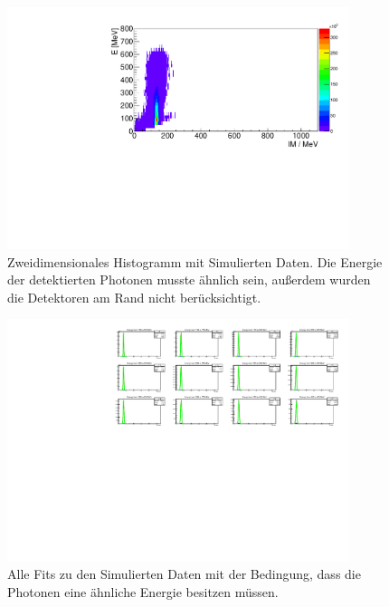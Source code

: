 \documentclass[a4paper,11pt,oneside,final,german,openbib,pdftex]{scrbook}
\begin{document}
{\begin{appendix}
\begin{figure}[h!]
	\begin{center}
		\includegraphics[width=100mm]{NewCalib/20171904Sim30DegreeCut}
		\caption[Simulation: 2D-Hist; Ohne Detektoren am Rand]{Zweidimensionales Histogramm mit Simulierten Daten. Die Energie der detektierten Photonen musste \"ahnlich sein, au{\ss}erdem wurden die Detektoren am Rand nicht ber\"ucksichtigt.}
		\label{fig:Sim-Data-2DHist-30-Degree-Edge}
	\end{center}
\end{figure}


\begin{figure}[h!]
	\begin{center}
		\includegraphics[width=100mm]{NewCalib/20171904SimNoCutAllFits}
		\caption[Simulation: Alle Fits; Keine weiteren Bedingungen]{Alle Fits zu den Simulierten Daten mit der Bedingung, dass die Photonen eine \"ahnliche Energie besitzen m\"ussen.}
		\label{fig:Sim-No-Cut-All-Fits}
	\end{center}
\end{figure}



\end{appendix}}
\end{document}
